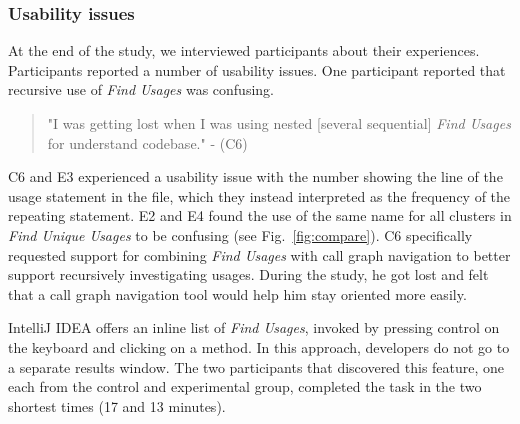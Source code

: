 \documentclass[conference]{IEEEtran}
\begin{document}
\subsubsection{Usability issues}
At the end of the study, we interviewed  participants about their experiences. Participants reported a number of usability issues. One participant reported that recursive use of \textit{Find Usages} was confusing. 
\begin{quote} "I was getting lost when I was using nested [several sequential] \textit{Find Usages} for understand codebase." - (C6)\end{quote}
\noindent C6 and E3 experienced a usability issue with the number showing the line of the usage statement in the file, which they instead interpreted as the frequency of the repeating statement.
E2 and E4 found the use of the same name for all clusters in \textit{Find Unique Usages} to be confusing (see Fig.~\ref{fig:compare}). 
C6 specifically requested support for combining \textit{Find Usages} with call graph navigation to better support recursively investigating usages. During the study, he got lost and felt that a call graph navigation tool would help him stay oriented more easily.\par


IntelliJ IDEA offers an inline list of \textit{Find Usages}, invoked by pressing control on the keyboard and clicking on a method. In this approach, developers do not go to a separate results window. The two participants that discovered this feature, one each from the control and experimental group, completed the task in the two shortest times (17 and 13 minutes).

\end{document}

